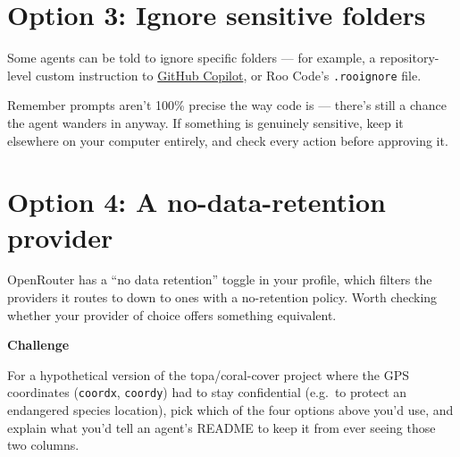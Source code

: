 \documentclass[
  letterpaper,
  DIV=11,
  numbers=noendperiod]{scrreprt}
\begin{document}
\section{Option 3: Ignore sensitive
folders}\label{option-3-ignore-sensitive-folders}

Some agents can be told to ignore specific folders --- for example, a
repository-level custom instruction to
\href{https://docs.github.com/en/copilot/customizing-copilot/adding-repository-custom-instructions-for-github-copilot}{GitHub
Copilot}, or Roo Code's \texttt{.rooignore} file.

Remember prompts aren't 100\% precise the way code is --- there's still
a chance the agent wanders in anyway. If something is genuinely
sensitive, keep it elsewhere on your computer entirely, and check every
action before approving it.

\section{Option 4: A no-data-retention
provider}\label{option-4-a-no-data-retention-provider}

OpenRouter has a ``no data retention'' toggle in your profile, which
filters the providers it routes to down to ones with a no-retention
policy. Worth checking whether your provider of choice offers something
equivalent.

\begin{tcolorbox}[enhanced jigsaw, toprule=.15mm, rightrule=.15mm, left=2mm, leftrule=.75mm, breakable, opacityback=0, arc=.35mm, colframe=quarto-callout-important-color-frame, bottomrule=.15mm, colback=white]
\begin{minipage}[t]{5.5mm}
\textcolor{quarto-callout-important-color}{\faExclamation}
\end{minipage}%
\begin{minipage}[t]{\textwidth - 5.5mm}

\vspace{-3mm}\textbf{Challenge}\vspace{3mm}

For a hypothetical version of the topa/coral-cover project where the GPS
coordinates (\texttt{coordx}, \texttt{coordy}) had to stay confidential
(e.g.~to protect an endangered species location), pick which of the four
options above you'd use, and explain what you'd tell an agent's README
to keep it from ever seeing those two columns.

\end{minipage}%
\end{tcolorbox}
\end{document}
